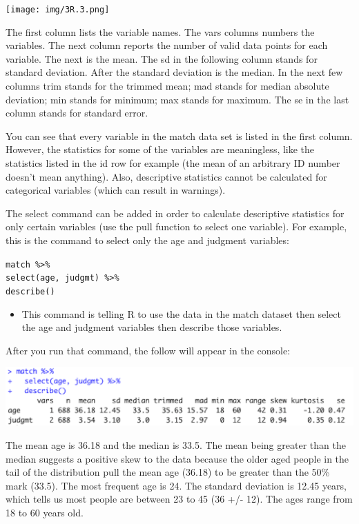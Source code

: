 \documentclass[
]{book}
\providecommand{\tightlist}{%
  \setlength{\itemsep}{0pt}\setlength{\parskip}{0pt}}
\begin{document}
\texttt{[image: img/3R.3.png]}

The first column lists the variable names. The vars columns numbers the variables. The next column reports the number of valid data points for each variable. The next is the mean. The sd in the following column stands for standard deviation. After the standard deviation is the median. In the next few columns trim stands for the trimmed mean; mad stands for median absolute deviation; min stands for minimum; max stands for maximum. The se in the last column stands for standard error.

You can see that every variable in the match data set is listed in the first column. However, the statistics for some of the variables are meaningless, like the statistics listed in the id row for example (the mean of an arbitrary ID number doesn't mean anything). Also, descriptive statistics cannot be calculated for categorical variables (which can result in warnings).

The select command can be added in order to calculate descriptive statistics for only certain variables (use the pull function to select one variable). For example, this is the command to select only the age and judgment variables:

\texttt{match\ \%\textgreater{}\%}\\
\texttt{select(age,\ judgmt)\ \%\textgreater{}\%}~\\
\texttt{describe()}

\begin{itemize}
\tightlist
\item
  This command is telling R to use the data in the match dataset then select the age and judgment variables then describe those variables.
\end{itemize}

After you run that command, the follow will appear in the console:

\includegraphics{img/3R.4.png}

The mean age is 36.18 and the median is 33.5. The mean being greater than the median suggests a positive skew to the data because the older aged people in the tail of the distribution pull the mean age (36.18) to be greater than the 50\% mark (33.5). The most frequent age is 24. The standard deviation is 12.45 years, which tells us most people are between 23 to 45 (36 +/- 12). The ages range from 18 to 60 years old.
\end{document}
